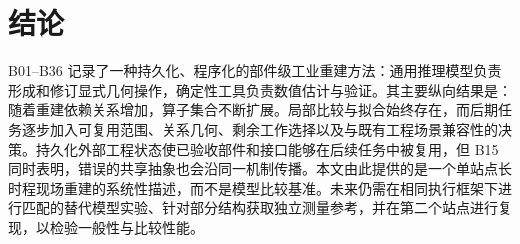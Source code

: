 \documentclass[10pt,a4paper]{article}
\begin{document}
\hypertarget{ux7ed3ux8bba}{%
\section{结论}\label{ux7ed3ux8bba}}

B01--B36
记录了一种持久化、程序化的部件级工业重建方法：通用推理模型负责形成和修订显式几何操作，确定性工具负责数值估计与验证。其主要纵向结果是：随着重建依赖关系增加，算子集合不断扩展。局部比较与拟合始终存在，而后期任务逐步加入可复用范围、关系几何、剩余工作选择以及与既有工程场景兼容性的决策。持久化外部工程状态使已验收部件和接口能够在后续任务中被复用，但
B15
同时表明，错误的共享抽象也会沿同一机制传播。本文由此提供的是一个单站点长时程现场重建的系统性描述，而不是模型比较基准。未来仍需在相同执行框架下进行匹配的替代模型实验、针对部分结构获取独立测量参考，并在第二个站点进行复现，以检验一般性与比较性能。
\balance
\small


\end{document}

